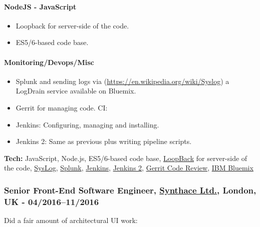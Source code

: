 \documentclass[
  a4paper,
]{article}
\providecommand{\tightlist}{%
  \setlength{\itemsep}{0pt}\setlength{\parskip}{0pt}}
\begin{document}
\hypertarget{nodejs---javascript}{%
\paragraph{NodeJS - JavaScript}\label{nodejs---javascript}}

\begin{itemize}
\tightlist
\item
  Loopback for server-side of the code.
\item
  ES5/6-based code base.
\end{itemize}

\hypertarget{monitoringdevopsmisc}{%
\paragraph{Monitoring/Devops/Misc}\label{monitoringdevopsmisc}}

\begin{itemize}
\tightlist
\item
  Splunk and sending logs via
  (\url{https://en.wikipedia.org/wiki/Syslog}) a LogDrain service
  available on Bluemix.
\item
  Gerrit for managing code. CI:
\item
  Jenkins: Configuring, managing and installing.
\item
  Jenkins 2: Same as previous plus writing pipeline scripts.
\end{itemize}

\textbf{Tech:} JavaScript, Node.js, ES5/6-based code base,
\href{https://loopback.io}{LoopBack} for server-side of the code,
\href{https://en.wikipedia.org/wiki/Syslog}{SysLog},
\href{http://www.splunk.com}{Splunk},
\href{https://www.jenkins.io}{Jenkins},
\href{https://www.jenkins.io/2.0}{Jenkins 2},
\href{https://www.gerritcodereview.com/}{Gerrit Code Review},
\href{https://en.wikipedia.org/wiki/Bluemix}{IBM Bluemix}

\hypertarget{senior-front-end-software-engineer-synthace-ltd.-london-uk---042016112016}{%
\subsubsection{\texorpdfstring{Senior Front-End Software Engineer,
\href{https://synthace.com}{Synthace Ltd.}, London, UK -
04/2016--11/2016}{Senior Front-End Software Engineer, Synthace Ltd., London, UK - 04/2016--11/2016}}\label{senior-front-end-software-engineer-synthace-ltd.-london-uk---042016112016}}

Did a fair amount of architectural UI work:
\end{document}
